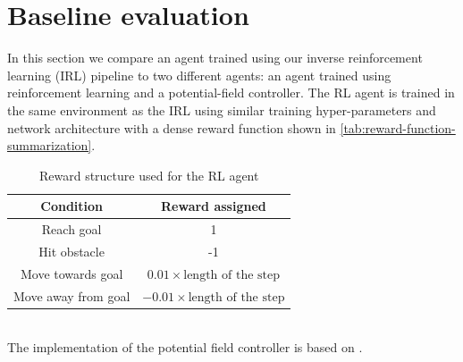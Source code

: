 \section{Baseline evaluation}
\label{sec:baseline-evaluation}
In this section we compare an agent trained using our inverse reinforcement learning (IRL) pipeline to two different agents: an agent trained using reinforcement learning and a potential-field controller. The RL agent is trained in the same environment as the IRL using similar training hyper-parameters and network architecture with a dense reward function shown in \autoref{tab:reward-function-summarization}.
\begin{table}[htbp]
    \caption{Reward structure used for the RL agent}
    \begin{center}
        \renewcommand{\arraystretch}{1.3}
        \begin{tabular}{|c|c|}
        \hline
        Condition & Reward assigned \\
        \hline
        Reach goal & 1 \\
        Hit obstacle & -1 \\
        Move towards goal & $0.01 \times \text{length of the step}$ \\
        Move away from goal & $ -0.01 \times \text{length of the step}$\\
        \hline
        \end{tabular}
    \end{center}
    \label{tab:reward-function-summarization}
\end{table}\\
The implementation of the potential field controller is based on \cite{khatib_1986}.\\  
